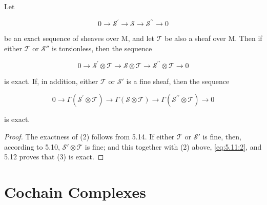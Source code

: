 \begin{theorem}\label{thm:5.15}
Let

\begin{equation}
\tag{1}\label{eq:5.15:1}
0\to\mathcal{S}^{\prime}\to\mathcal{S}\to\mathcal{S}^{\prime \prime}\to0
\end{equation}

be an exact sequence of sheaves over M, and let  $ \mathcal{T} $ be also a sheaf over M. Then if either  $ \mathcal{T} $ or $\mathcal{S}''$ is torsionless, then the sequence

\begin{equation}
\tag{2}\label{eq:5.15:2}
0\to\mathcal{S}^{\prime}\otimes\mathcal{T}\to\mathcal{S}\otimes\mathcal{T}\to\mathcal{S}^{\prime \prime}\otimes\mathcal{T}\to0
\end{equation}

is exact. If, in addition, either  $ \mathcal{T} $ or  $ \mathcal{S}' $ is a fine sheaf, then the sequence

\begin{equation}
\tag{3}\label{eq:5.15:3}
0\to\Gamma(\mathcal{S}^{\prime}\otimes\mathcal{T})\to\Gamma(\mathcal{S}\otimes\mathcal{T})\to\Gamma(\mathcal{S}^{\prime \prime}\otimes\mathcal{T})\to0
\end{equation}

is exact.

\end{theorem}

\begin{proof}
The exactness of (2) follows from 5.14. If either $\mathcal{T}$ or $\mathcal{S}'$ is fine, then, according to 5.10, $\mathcal{S}' \otimes \mathcal{T}$ is fine; and this together with (2) above, \eqref{eq:5.11:2}, and 5.12 proves that (3) is exact.

\end{proof}

\section{Cochain Complexes}


